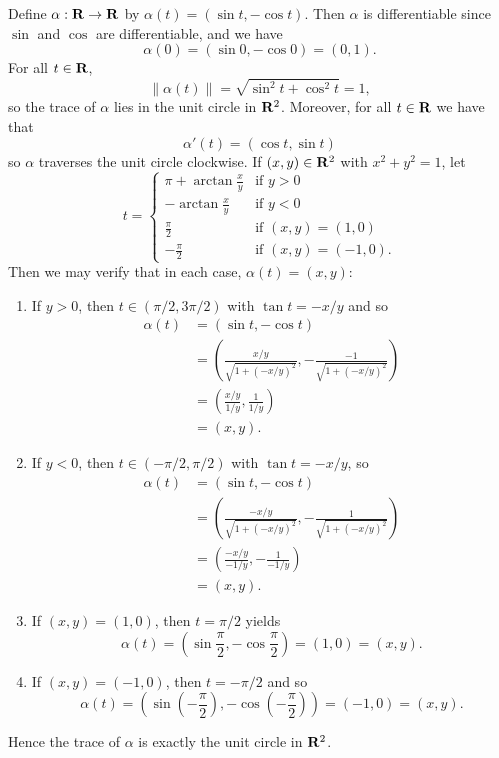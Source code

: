 \begin{ex}
Define $\alpha: \mathbf{R} \to \mathbf{R}$ by $\alpha(t) = (\sin t, -\cos t)$. Then $\alpha$ is differentiable since $\sin$ and $\cos$ are differentiable, and we have \[\alpha(0) = (\sin 0, -\cos 0) = (0, 1).\] For all $t \in \mathbf{R}$, \[\|\alpha(t)\| = \sqrt{\sin^2 t + \cos^2 t} = 1,\] so the trace of $\alpha$ lies in the unit circle in $\mathbf{R}^2$. Moreover, for all $t \in \mathbf{R}$ we have that \[\alpha'(t) = (\cos t, \sin t)\] so $\alpha$ traverses the unit circle clockwise. If $(x, y) \in \mathbf{R}^2$ with $x^2 + y^2 = 1$, let \[t = \begin{cases}
\pi + \arctan\frac{x}{y} & \text{if } y > 0\\
-\arctan\frac{x}{y} & \text{if } y < 0\\
\frac{\pi}{2} & \text{if } (x, y) = (1, 0)\\
-\frac{\pi}{2} & \text{if } (x, y) = (-1, 0).
\end{cases}\] Then we may verify that in each case, $\alpha(t) = (x, y)$:
\begin{enumerate}[label = (\roman*)]
\item If $y > 0$, then $t \in (\pi/2, 3\pi/2)$ with $\tan t = -x/y$ and so 
\begin{align*}
\alpha(t) & = (\sin t, -\cos t)\\
& = \left(\frac{x/y}{\sqrt{1 + (-x/y)^2}}, -\frac{-1}{\sqrt{1 + (-x/y)^2}}\right)\\
& = \left(\frac{x/y}{1/y}, \frac{1}{1/y}\right)\\
& = (x, y).
\end{align*}

\item If $y < 0$, then $t \in (-\pi/2, \pi/2)$ with $\tan t = -x/y$, so
\begin{align*}
\alpha(t) & = (\sin t, -\cos t)\\
& = \left(\frac{-x/y}{\sqrt{1 + (-x/y)^2}}, -\frac{1}{\sqrt{1 + (-x/y)^2}}\right)\\
& = \left(\frac{-x/y}{-1/y}, -\frac{1}{-1/y}\right)\\
& = (x, y).
\end{align*}

\item If $(x, y) = (1, 0)$, then $t = \pi/2$ yields \[\alpha(t) = \left(\sin\frac{\pi}{2}, -\cos\frac{\pi}{2}\right) = (1, 0) = (x, y).\]

\item If $(x, y) = (-1, 0)$, then $t = -\pi/2$ and so \[\alpha(t) = \left(\sin\left(-\frac{\pi}{2}\right), -\cos\left(-\frac{\pi}{2}\right)\right) = (-1, 0) = (x, y).\]
\end{enumerate}
Hence the trace of $\alpha$ is exactly the unit circle in $\mathbf{R}^2$.
\end{ex}

